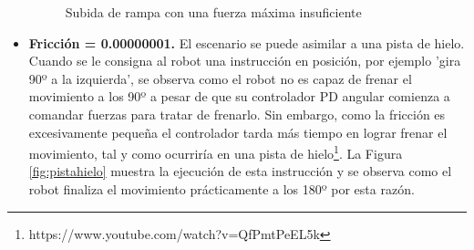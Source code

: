 \begin{itemize}
\begin{figure}[h!]
\begin{subfigure}[b]{0.3\textwidth}
  \end{subfigure}
\caption{Subida de rampa con una fuerza máxima insuficiente}
\label{fig:rampa}
\end{figure}
    \item \textbf{Fricción = 0.00000001.} El escenario se puede asimilar a una pista de hielo. Cuando se le consigna al robot una instrucción en posición, por ejemplo 'gira 90º a la izquierda', se observa como el robot no es capaz de frenar el movimiento a los 90º a pesar de que su controlador PD angular comienza a comandar fuerzas para tratar de frenarlo. Sin embargo, como la fricción es excesivamente pequeña el controlador tarda más tiempo en lograr frenar el movimiento, tal y como ocurriría en una pista de hielo\footnote{https://www.youtube.com/watch?v=QfPmtPeEL5k}. La Figura \ref{fig:pistahielo} muestra la ejecución de esta instrucción y se observa como el robot finaliza el movimiento prácticamente a los 180º por esta razón.
    

\end{itemize}
